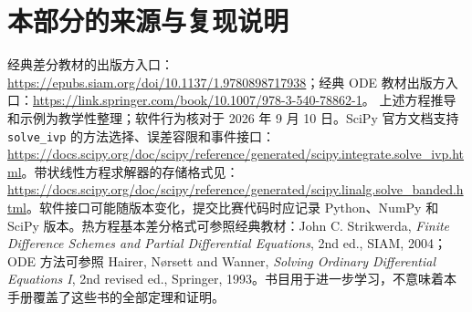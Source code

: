 \section{本部分的来源与复现说明}
经典差分教材的出版方入口：\url{https://epubs.siam.org/doi/10.1137/1.9780898717938}；经典 ODE 教材出版方入口：\url{https://link.springer.com/book/10.1007/978-3-540-78862-1}。
上述方程推导和示例为教学性整理；软件行为核对于 2026 年 9 月 10 日。SciPy 官方文档支持 \texttt{solve\_ivp} 的方法选择、误差容限和事件接口：\url{https://docs.scipy.org/doc/scipy/reference/generated/scipy.integrate.solve_ivp.html}。带状线性方程求解器的存储格式见：\url{https://docs.scipy.org/doc/scipy/reference/generated/scipy.linalg.solve_banded.html}。软件接口可能随版本变化，提交比赛代码时应记录 Python、NumPy 和 SciPy 版本。热方程基本差分格式可参照经典教材：John C. Strikwerda, \textit{Finite Difference Schemes and Partial Differential Equations}, 2nd ed., SIAM, 2004；ODE 方法可参照 Hairer, N\o rsett and Wanner, \textit{Solving Ordinary Differential Equations I}, 2nd revised ed., Springer, 1993。书目用于进一步学习，不意味着本手册覆盖了这些书的全部定理和证明。
